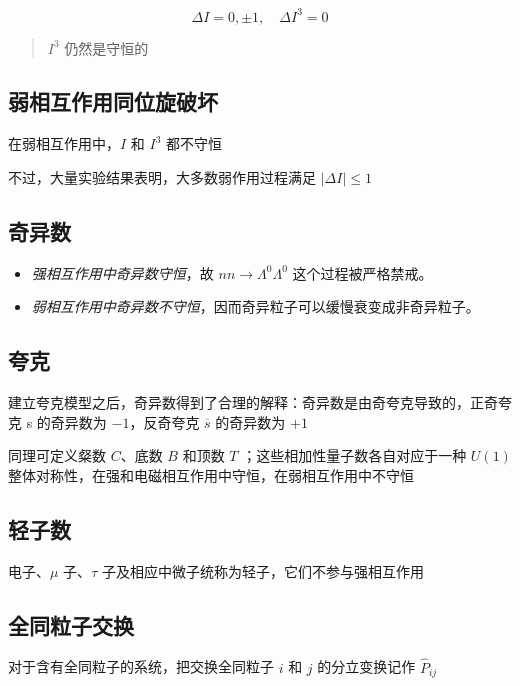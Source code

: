 \documentclass[oneside,a4paper,openany,11pt]{ctexbook}
\begin{document}
\begin{equation}
    \Delta I = 0, \pm 1, \quad \Delta I^3 = 0
\end{equation}

\begin{quote}
    $I^3$ 仍然是守恒的
\end{quote}

\subsection{弱相互作用同位旋破坏}

在弱相互作用中，$I$ 和 $I^3$ 都不守恒

不过，大量实验结果表明，大多数弱作用过程满足 $|\Delta I| \le 1$

\subsection{奇异数}

\begin{itemize}
    \item \emph{强相互作用中奇异数守恒}，故 $nn \to \Lambda^0 \Lambda^0$ 这个过程被严格禁戒。
    \item \emph{弱相互作用中奇异数不守恒}，因而奇异粒子可以缓慢衰变成非奇异粒子。
\end{itemize}

\subsection{夸克}

建立夸克模型之后，奇异数得到了合理的解释：奇异数是由奇夸克导致的，正奇夸克 s 的奇异数为 $-1$，反奇夸克 $\overline{s}$ 的奇异数为 $+1$

同理可定义粲数 $C$、底数 $B$ 和顶数 $T$ ；这些相加性量子数各自对应于一种 $U(1)$
整体对称性，在强和电磁相互作用中守恒，在弱相互作用中不守恒

\subsection{轻子数}

电子、$\mu$ 子、$\tau$ 子及相应中微子统称为轻子，它们不参与强相互作用

\subsection{全同粒子交换}

对于含有全同粒子的系统，把交换全同粒子 $i$ 和 $j$ 的分立变换记作 $\hat{P}_{ij}$
\end{document}
